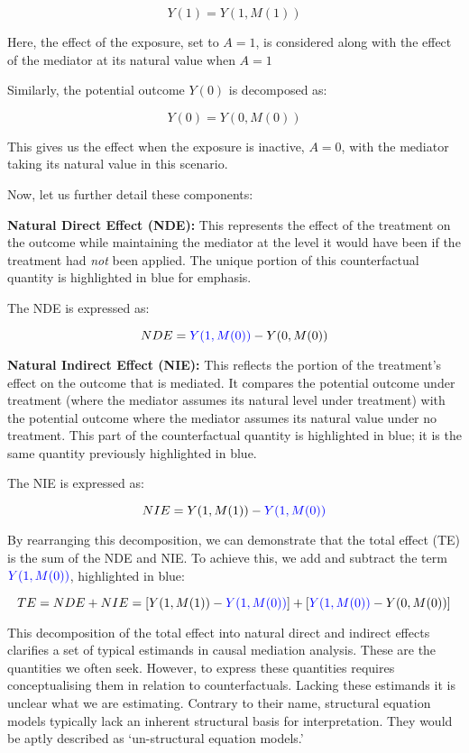 \documentclass[
  singlecolumn,
  9pt]{article}
\begin{document}
\[ 
Y(1) = Y(1, M(1))
\]

Here, the effect of the exposure, set to \(A = 1\), is considered along
with the effect of the mediator at its natural value when \(A = 1\)

Similarly, the potential outcome \(Y(0)\) is decomposed as:

\[ 
Y(0) = Y(0, M(0))
\]

This gives us the effect when the exposure is inactive, \(A = 0\), with
the mediator taking its natural value in this scenario.

Now, let us further detail these components:

\textbf{Natural Direct Effect (NDE):} This represents the effect of the
treatment on the outcome while maintaining the mediator at the level it
would have been if the treatment had \emph{not} been applied. The unique
portion of this counterfactual quantity is highlighted in blue for
emphasis.

The NDE is expressed as:

\[
 NDE = \textcolor{blue}{Y(1, M(0))} - Y(0, M(0))
 \]

\textbf{Natural Indirect Effect (NIE):} This reflects the portion of the
treatment's effect on the outcome that is mediated. It compares the
potential outcome under treatment (where the mediator assumes its
natural level under treatment) with the potential outcome where the
mediator assumes its natural value under no treatment. This part of the
counterfactual quantity is highlighted in blue; it is the same quantity
previously highlighted in blue.

The NIE is expressed as:

\[
 NIE = Y(1, M(1)) - \textcolor{blue}{Y(1, M(0))}
\]

By rearranging this decomposition, we can demonstrate that the total
effect (TE) is the sum of the NDE and NIE. To achieve this, we add and
subtract the term \(\textcolor{blue}{Y(1, M(0))}\), highlighted in blue:

\[
TE = NDE + NIE = [Y(1, M(1)) - \textcolor{blue}{Y(1, M(0))}] + [\textcolor{blue}{Y(1, M(0))} - Y(0, M(0))]
\]

This decomposition of the total effect into natural direct and indirect
effects clarifies a set of typical estimands in causal mediation
analysis. These are the quantities we often seek. However, to express
these quantities requires conceptualising them in relation to
counterfactuals. Lacking these estimands it is unclear what we are
estimating. Contrary to their name, structural equation models typically
lack an inherent structural basis for interpretation. They would be
aptly described as `un-structural equation models.'
\end{document}
